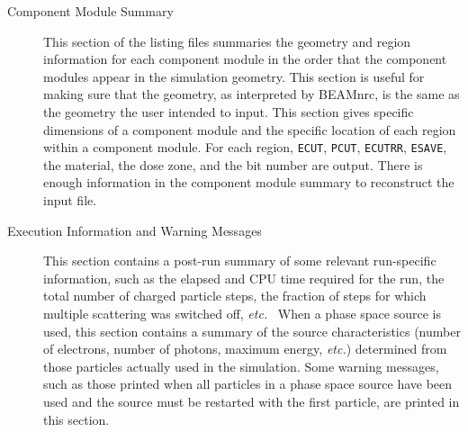 \documentclass[12pt,twoside]{article}
\newcommand{\etc}{{\em etc.}}
\begin{document}
\begin{description}
\begin{description}
\item [Component Module Summary]
This section of the listing files summaries the geometry and region
information for each component module in the order that the component
modules appear in the simulation geometry.  This section is useful for
making sure that the geometry, as interpreted by BEAMnrc, is the same as the
geometry the user intended to input.  This section gives specific
dimensions of a component module and the specific location of each
region within a component module.  For each region, \verb+ECUT+,
\verb+PCUT+, \verb+ECUTRR+, \verb+ESAVE+, the material,
the dose zone, and the bit number are
output.  There is enough information in the component module
summary to reconstruct the input file.

\item [Execution Information and Warning Messages]
This section contains a post-run summary of some relevant run-specific
information, such as the elapsed and CPU time required for the run, the
total number of charged particle steps, the fraction of steps for which
multiple scattering was switched off, \etc~  When a phase space source is
used,  this section contains a summary of the source
characteristics (number of electrons, number of photons, maximum energy,
\etc) determined from those particles actually used in the simulation.
Some warning messages, such as those printed when all particles in a
phase space source have been used and the source must be restarted with the
first particle, are printed in this section.


\end{description}
\end{description}
\end{document}
